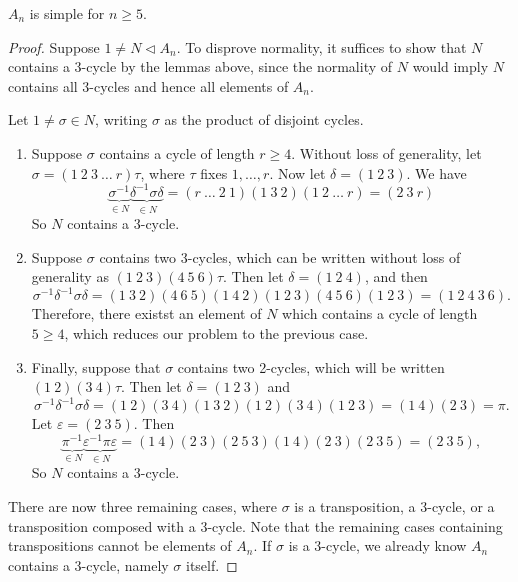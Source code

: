 \documentclass[a4paper]{amsart}
\begin{document}
\begin{theorem}
    $A_n$ is simple for $n \geq 5$.
\end{theorem}
\begin{proof}
    Suppose $1 \neq N \triangleleft A_n$. To disprove normality, it suffices to show that $N$ contains a 3-cycle by the lemmas above, since the normality of $N$ would imply $N$ contains all 3-cycles and hence all elements of $A_n$.

Let $1 \neq \sigma \in N$, writing $\sigma$ as the product of disjoint cycles.
\begin{enumerate}
    \item 
Suppose $\sigma$ contains a cycle of length $r \geq 4$. Without loss of generality, let $\sigma = (1\ 2\ 3\ \dots\ r) \tau$, where $\tau$ fixes $1, \dots, r$. Now let $\delta = (1\ 2\ 3)$. We have
$$
\underbrace{\sigma^{-1} }_{\in N} \underbrace{\delta^{-1} \sigma \delta}_{\in N} = (r\ \dots\ 2\ 1)(1\ 3\ 2)(1\ 2\ \dots\ r) = (2\ 3\ r)
$$
So $N$ contains a 3-cycle.
\item
Suppose $\sigma$ contains two 3-cycles, which can be written without loss of generality as $(1\ 2\ 3)(4\ 5\ 6)\tau$. Then let $\delta = (1\ 2\ 4)$, and then
$$
\sigma^{-1}\delta^{-1}\sigma \delta = (1\ 3\ 2)(4\ 6\ 5)(1\ 4\ 2)(1\ 2\ 3)(4\ 5\ 6)(1\ 2\ 3) = (1\ 2\ 4\ 3\ 6).
$$
Therefore, there existst an element of $N$ which contains a cycle of length $5 \geq 4$, which reduces our problem to the previous case.
\item
Finally, suppose that $\sigma$ contains two 2-cycles, which will be written $(1\ 2)(3\ 4)\tau$. Then let $\delta = (1\ 2\ 3)$ and
$$
\sigma^{-1}\delta^{-1}\sigma\delta = (1\ 2)(3\ 4)(1\ 3\ 2)(1\ 2)(3\ 4)(1\ 2\ 3) = (1\ 4)(2\ 3) = \pi.
$$
Let $\varepsilon = (2\ 3\ 5)$. Then
$$
\underbrace{\pi^{-1} }_{\in N}\underbrace{\varepsilon^{-1} \pi \varepsilon}_{\in N} = (1\ 4)(2\ 3)(2\ 5\ 3)(1\ 4)(2\ 3)(2\ 3\ 5) = (2\ 3\ 5),
$$
So $N$ contains a 3-cycle.
\end{enumerate}
There are now three remaining cases, where $\sigma$ is a transposition, a 3-cycle, or a transposition composed with a 3-cycle. Note that the remaining cases containing transpositions cannot be elements of $A_n$. If $\sigma$ is a 3-cycle, we already know $A_n$ contains a 3-cycle, namely $\sigma$ itself.
\end{proof}
\end{document}
